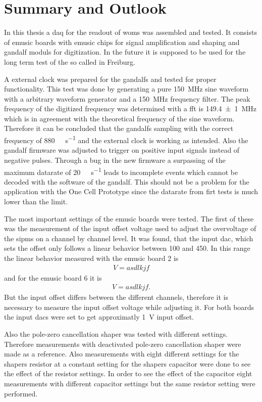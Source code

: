 \chapter{Summary and Outlook}
In this thesis a \ac{daq} for the readout of \acp{wom} was assembled and tested.
It consists of \ac{emusic} boards with \ac{emusic} chips for signal amplification and shaping and \ac{gandalf} moduls for digitization.
In the future it is supposed to be used for the long term test of the so called  in Freiburg.

A external clock was prepared for the \acp{gandalf} and tested for proper functionality.
This test was done by generating a pure \SI{150}{\mega\hertz} sine waveform with a arbitrary waveform generator and a \SI{150}{\mega\hertz} frequency filter.
The peak frequency of the digitized frequency was determined with a \ac{fft} is \SI{149.4(10)}{\mega\hertz} which is in agreement with the theoretical frequency of the sine waveform.
Therefore it can be concluded that the \acp{gandalf} sampling with the correct frequency of \SI{880}{\mega\sample\per\second} and the external clock is working as intended.
Also the \ac{gandalf} firmware was adjusted to trigger on positive input signals instead of negative pulses.
Through a bug in the new firmware a surpassing of the maximum datarate of \SI{20}{\mega\byte\per\second} leads to incomplete events which cannot be decoded with the software of the \ac{gandalf}.
This should not be a problem for the application with the One Cell Prototype since the datarate from firt tests is much lower than the limit.

The most important settings of the \ac{emusic} boards were tested.
The first of these was the measurement of the input offset voltage used to adjust the overvoltage of the \acp{sipm} on a channel by channel level.
It was found, that the input \ac{dac}, which sets the offset only follows a linear behavior between \SI{100}{\dacu} and \SI{450}{\dacu}.
In this range the linear behavior measured with the \ac{emusic} board 2 is
\begin{align}
	V = asdlkjf
\end{align}
and for the \ac{emusic} board 6 it is
\begin{align}
	V = asdlkjf.
\end{align}
But the input offset differs between the different channels, therefore it is necessary to measure the input offset voltage while adjusting it.
For both boards the input \acp{dac} were set to get approximatly \SI{1}{\volt} input offset.

Also the pole-zero cancellation shaper was tested with different settings.
Therefore measurements with deactivated pole-zero cancellation shaper were made as a reference.
Also measurements with eight different settings for the shapers resistor at a constant setting for the shapers capacitor were done to see the effect of the resistor settings.
In order to see the effect of the capacitor eight measurements with different capacitor settings but the same resistor setting were performed.


